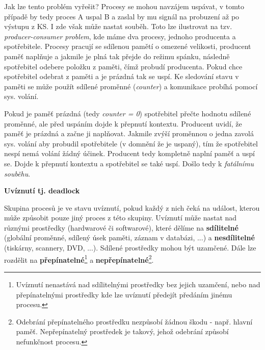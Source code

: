 \vspace{0,5cm}

Jak lze tento problém vyřešit? Procesy se mohou navzájem uspávat, v tomto případě by tedy proces A uspal B a zaslal by mu signál na probuzení až po výstupu z KS. I zde však může nastat souběh. Toto lze ilustrovat na tzv. \textit{producer-consumer problem}, kde máme dva procesy, jednoho producenta a spotřebitele. Procesy pracují se sdílenou pamětí o omezené velikosti, producent paměť naplňuje a jakmile je plná tak přejde do režimu spánku, následně spotřebitel odebere položku z paměti, čímž probudí producenta. Pokud chce spotřebitel odebrat z paměti a je prázdná tak se uspí. Ke sledování stavu v paměti se může použít sdílené proměnné (\textit{counter}) a komunikace probíhá pomocí sys. volání.

\vspace{0,5cm}

Pokud je paměť prázdná (tedy \textit{counter = 0}) spotřebitel přečte hodnotu sdílené proměnné, ale před uspáním dojde k přepnutí kontextu. Producent uvidí, že paměť je prázdná a začne ji naplňovat. Jakmile zvýší proměnnou o jedna zavolá sys. volání aby probudil spotřebitele (v domnění že je uspaný), tím že spotřebitel nespí nemá volání žádný účinek. Producent tedy kompletně naplní paměť a uspí se. Dojde k přepnutí kontextu a spotřebitel se také uspí. Došlo tedy k \textit{fatálnímu souběhu}. 

\begin{large}
    \vspace{0,5cm}
    \textbf{Uvíznutí tj. deadlock}    
\end{large}

Skupina procesů je ve stavu uvíznutí, pokud každý z nich čeká na událost, kterou může způsobit pouze jiný proces z této skupiny. Uvíznutí může nastat nad různými prostředky (hardwarové či softwarové), které dělíme na \textbf{sdílitelné} (globální proměnné, sdílený úsek paměti, záznam v databázi, ...) a \textbf{nesdílitelné} (tiskárny, scannery, DVD, ...). Sdílené prostředky mohou být uzamčené. Dále lze rozdělit na \textbf{přepínatelné}\footnote{Uvíznutí nenastává nad sdílitelnými prostředky bez jejich uzamčení, nebo nad přepínatelnými prostředky kde lze uvíznutí předejít předáním jinému procesu.} a \textbf{nepřepínatelné}\footnote{Odebrání přepínatelného prostředku nezpůsobí žádnou škodu - např. hlavní paměť. Nepřepínatelný prostředek je takový, jehož odebrání způsobí nefunkčnost procesu.}. 

\vspace{0,5cm}

